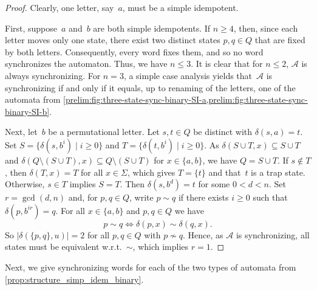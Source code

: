 \begin{proof}
	Clearly, one letter, say~$a$, must be a simple idempotent.
		
	First, suppose~$a$ and~$b$ are both simple idempotents.
	If $n \ge 4$, then, since each letter moves only one state,
	there exist two distinct states $p,q \in Q$
	that are fixed by both letters.
	Consequently, every word fixes them, and so
	no word synchronizes the automaton.
	Thus, we have $n \le 3$.
	It is clear that for $n \le 2$, $\mathcal A$
	is always synchronizing.
	For $n = 3$, 
	a simple case analysis yields that~$\mathcal A$
	is synchronizing if and only if it equals,
	up to renaming of the letters, one 
	of the automata from \cref{prelim:fig:three-state-sync-binary-SI-a,prelim:fig:three-state-sync-binary-SI-b}.
	
	Next, let~$b$ be a permutational letter. Let $s,t \in Q$ be distinct with $\delta(s, a) = t$.
	Set $S = \{\delta(s, b^i) \mid i \ge 0\}$
	and $T = \{\delta(t, b^i) \mid i \ge 0\}$.
	As $\delta(S \cup T, x) \subseteq S \cup T$
	and $\delta(Q \setminus (S \cup T), x) \subseteq Q \setminus (S \cup T)$ for $x \in \{a,b\}$,
	we have $Q = S\cup T$.	
	If $s \notin T$, then $\delta(T, x) = T$
	for all $x \in \Sigma$, which gives
	$T = \{t\}$ and that~$t$ is a trap state.
	Otherwise, $s \in T$ implies $S = T$. Then
	$\delta(s, b^d) = t$ for some 
	$0 < d < n$. Set $r = \gcd(d, n)$
	and, for $p, q \in Q$, write $p \sim q$
	if there exists $i \ge 0$ such that $\delta(p, b^{ir}) = q$.
	For all $x \in \{a,b\}$ and $p,q \in Q$ we have
	\[
	p \sim q \Leftrightarrow \delta(p, x) \sim \delta(q, x).
	\]
	So $|\delta(\{p,q\}, u)| = 2$ for all $p, q \in Q$ with $p \not\sim q$.
	Hence, as $\mathcal A$ is synchronizing, all states must be equivalent
	w.r.t.~$\sim$, which implies $r = 1$.	
%	
\end{proof}



Next, we give synchronizing words for each of the two types of automata
from \cref{prop:structure_simp_idem_binary}.

